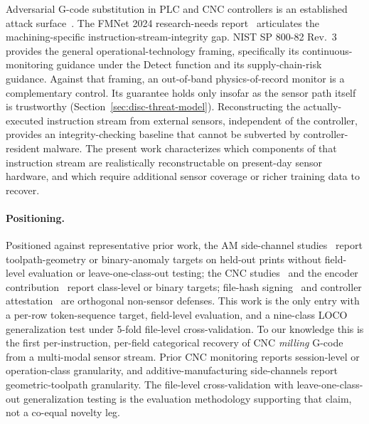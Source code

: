 \documentclass[sensors,article,submit,moreauthors,pdftex]{Definitions/mdpi}
\begin{document}
Adversarial G-code substitution in PLC and CNC controllers is an established attack surface~\cite{zonouz2014plc,sturm2014cyber,yampolskiy2018security,kimmell2025cnc,belikovetsky2017drowned}. The FMNet 2024 research-needs report~\cite{nist2024fmnet} articulates the machining-specific instruction-stream-integrity gap. NIST SP 800-82 Rev.~3~\cite{nist2023sp80082} provides the general operational-technology framing, specifically its continuous-monitoring guidance under the Detect function and its supply-chain-risk guidance. Against that framing, an out-of-band physics-of-record monitor is a complementary control. Its guarantee holds only insofar as the sensor path itself is trustworthy (Section~\ref{sec:disc-threat-model}). Reconstructing the actually-executed instruction stream from external sensors, independent of the controller, provides an integrity-checking baseline that cannot be subverted by controller-resident malware. The present work characterizes which components of that instruction stream are realistically reconstructable on present-day sensor hardware, and which require additional sensor coverage or richer training data to recover.

\paragraph{Positioning.} Positioned against representative prior work, the AM side-channel studies~\cite{alfaruque2016acoustic,song2016my,chhetri2016kcad,chattopadhyay2025video} report toolpath-geometry or binary-anomaly targets on held-out prints without field-level evaluation or leave-one-class-out testing; the CNC studies~\cite{stathatos2024cnn,coelho2024anomaly,kimmell2025cnc} and the encoder contribution~\cite{encoder_paper} report class-level or binary targets; file-hash signing~\cite{belikovetsky2017drowned,nist2024fmnet} and controller attestation~\cite{zonouz2014plc} are orthogonal non-sensor defenses. This work is the only entry with a per-row token-sequence target, field-level evaluation, and a nine-class LOCO generalization test under 5-fold file-level cross-validation.\label{sec:related-comparison} To our knowledge this is the first per-instruction, per-field categorical recovery of CNC \emph{milling} G-code from a multi-modal sensor stream. Prior CNC monitoring reports session-level or operation-class granularity, and additive-manufacturing side-channels report geometric-toolpath granularity. The file-level cross-validation with leave-one-class-out generalization testing is the evaluation methodology supporting that claim, not a co-equal novelty leg.
\end{document}
